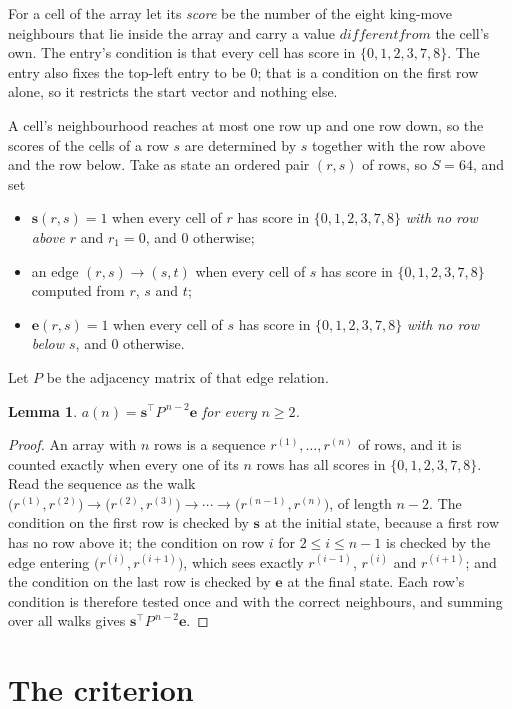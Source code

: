 \documentclass[11pt,a4paper]{article}
\theoremstyle{plain}
\newtheorem{lemma}[theorem]{Lemma}
\theoremstyle{definition}
\begin{document}
For a cell of the array let its \emph{score} be the number of the eight king-move neighbours that lie inside
the array and carry a value $different from$ the cell's own. The entry's condition is that every cell
has score in $\{0,1,2,3,7,8\}$. The entry also fixes the top-left entry to be $0$; that is a condition on the first row alone, so it restricts the start vector and nothing else.

A cell's neighbourhood reaches at most one row up and one row down, so the scores of the
cells of a row $s$ are determined by $s$ together with the row above and the row below.
Take as state an ordered pair $(r,s)$ of rows, so $S=64$, and set
\begin{itemize}
\item $\mathbf{s}(r,s)=1$ when every cell of $r$ has score in $\{0,1,2,3,7,8\}$ \emph{with no row
above $r$} and $r_1=0$, and $0$ otherwise;
\item an edge $(r,s)\to(s,t)$ when every cell of $s$ has score in $\{0,1,2,3,7,8\}$ computed from
$r$, $s$ and $t$;
\item $\mathbf{e}(r,s)=1$ when every cell of $s$ has score in $\{0,1,2,3,7,8\}$ \emph{with no row
below $s$}, and $0$ otherwise.
\end{itemize}
Let $P$ be the adjacency matrix of that edge relation.

\begin{lemma}\label{lem:walk}
$a(n)=\mathbf{s}^{\!\top}P^{\,n-2}\mathbf{e}$ for every $n\ge2$.
\end{lemma}

\begin{proof}
An array with $n$ rows is a sequence $r^{(1)},\dots,r^{(n)}$ of rows, and it is counted
exactly when every one of its $n$ rows has all scores in $\{0,1,2,3,7,8\}$. Read the sequence as the
walk $\bigl(r^{(1)},r^{(2)}\bigr)\to\bigl(r^{(2)},r^{(3)}\bigr)\to\cdots\to
\bigl(r^{(n-1)},r^{(n)}\bigr)$, of length $n-2$. The condition on the first row is
checked by $\mathbf{s}$ at the initial state, because a first row has no row above it; the
condition on row $i$ for $2\le i\le n-1$ is checked by the edge entering
$\bigl(r^{(i)},r^{(i+1)}\bigr)$, which sees exactly $r^{(i-1)}$, $r^{(i)}$ and
$r^{(i+1)}$; and the condition on the last row is checked by $\mathbf{e}$ at the final
state. Each row's condition is therefore tested once and with the correct neighbours, and
summing over all walks gives $\mathbf{s}^{\!\top}P^{\,n-2}\mathbf{e}$.
\end{proof}

\section{The criterion}
\end{document}
